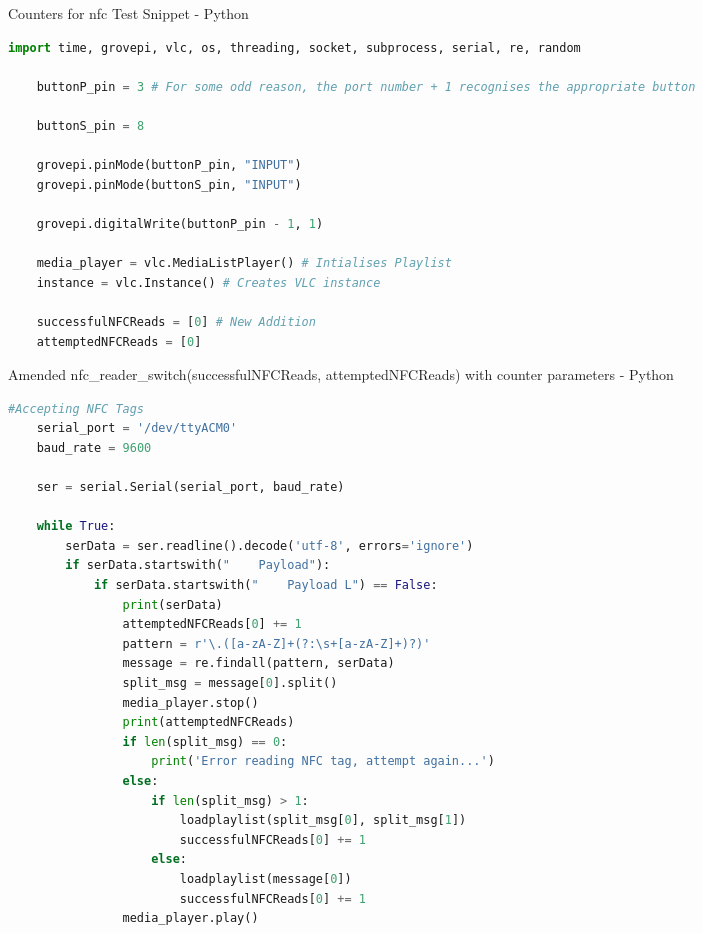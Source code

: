 \begin{algorithm}[H]
  \caption{Counters for \gls{nfc} Test Snippet - Python}
  \label{alg:globalCounters}
  \begin{lstlisting}[language=Python]
    import time, grovepi, vlc, os, threading, socket, subprocess, serial, re, random

    buttonP_pin = 3 # For some odd reason, the port number + 1 recognises the appropriate button

    buttonS_pin = 8

    grovepi.pinMode(buttonP_pin, "INPUT")
    grovepi.pinMode(buttonS_pin, "INPUT")

    grovepi.digitalWrite(buttonP_pin - 1, 1)

    media_player = vlc.MediaListPlayer() # Intialises Playlist
    instance = vlc.Instance() # Creates VLC instance

    successfulNFCReads = [0] # New Addition
    attemptedNFCReads = [0]
  \end{lstlisting}
\end{algorithm}

\begin{algorithm}[H]
  \caption{Amended nfc\_reader\_switch(successfulNFCReads, attemptedNFCReads) with counter parameters - Python}
  \label{alg:testNFCSwitch}
  \begin{lstlisting}[language=Python]
    #Accepting NFC Tags
    serial_port = '/dev/ttyACM0'
    baud_rate = 9600

    ser = serial.Serial(serial_port, baud_rate)

    while True:
        serData = ser.readline().decode('utf-8', errors='ignore')
        if serData.startswith("    Payload"):
            if serData.startswith("    Payload L") == False:
                print(serData)
                attemptedNFCReads[0] += 1
                pattern = r'\.([a-zA-Z]+(?:\s+[a-zA-Z]+)?)'
                message = re.findall(pattern, serData) 
                split_msg = message[0].split()
                media_player.stop()
                print(attemptedNFCReads)
                if len(split_msg) == 0:
                    print('Error reading NFC tag, attempt again...')
                else:
                    if len(split_msg) > 1:
                        loadplaylist(split_msg[0], split_msg[1])
                        successfulNFCReads[0] += 1
                    else:
                        loadplaylist(message[0])
                        successfulNFCReads[0] += 1
                media_player.play()
  \end{lstlisting}
\end{algorithm}

